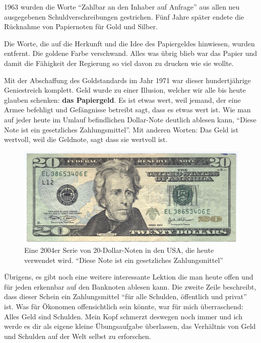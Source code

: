 1963 wurden die Worte \enquote{Zahlbar an den Inhaber auf Anfrage} aus allen neu
ausgegebenen Schuldverschreibungen gestrichen. Fünf Jahre später endete die
Rücknahme von Papiernoten für Gold und Silber.

Die Worte, die auf die Herkunft und die Idee des Papiergeldes hinwiesen, wurden
entfernt. Die goldene Farbe verschwand. Alles was übrig blieb war das Papier und
damit die Fähigkeit der Regierung so viel davon zu drucken wie sie wollte.

Mit der Abschaffung des Goldstandards im Jahr 1971 war dieser hundertjährige
Geniestreich komplett. Geld wurde zu einer Illusion, welcher wir alle bis heute
glauben schenken: \textbf{das Papiergeld}. Es ist etwas wert, weil jemand, der
eine Armee befehligt und Gefängnisse betreibt sagt, dass es etwas wert ist. Wie
man auf jeder heute im Umlauf befindlichen Dollar-Note deutlich ablesen kann,
\enquote{Diese Note ist ein gesetzliches Zahlungsmittel}. Mit anderen Worten:
Das Geld ist wertvoll, weil die Geldnote, sagt dass sie wertvoll ist.

\begin{figure}
  \centering
  \includegraphics{assets/images/us-dollar-2004.jpg}
  \caption{Eine 2004er Serie von 20-Dollar-Noten in den USA, die heute verwendet
  wird. \enquote{Diese Note ist ein gesetzliches Zahlungsmittel}}
  \label{fig:us-dollar-2004}
\end{figure}

Übrigens, es gibt noch eine weitere interessante Lektion die man heute offen und
für jeden erkennbar auf den Banknoten ablesen kann. Die zweite Zeile beschreibt,
dass dieser Schein ein Zahlungsmittel \enquote{für alle Schulden, öffentlich und
privat} ist. Was für Ökonomen offensichtlich sein könnte, war für mich
überraschend: Alles Geld sind Schulden. Mein Kopf schmerzt deswegen noch immer
und ich werde es dir als eigene kleine Übungsaufgabe überlassen, das Verhältnis
von Geld und Schulden auf der Welt selbst zu erforschen.

